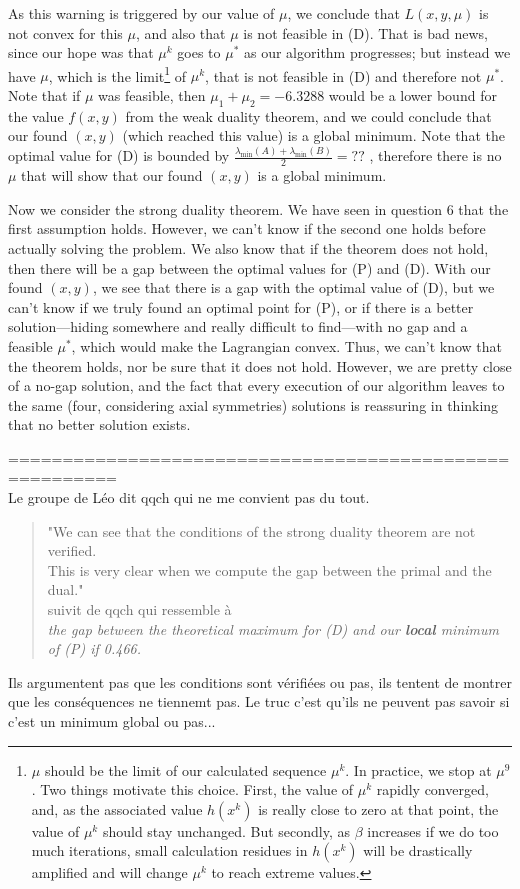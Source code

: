 \documentclass{article}
\begin{document}
As this warning is triggered by our value of $\mu$, we conclude that $L(x, y, \mu)$ is not convex for this $\mu$, and also that $\mu$ is not feasible in (D). That is bad news, since our hope was that $\mu^k$ goes to $\mu^*$ as our algorithm progresses; but instead we have $\mu$, which is the limit\footnote{$\mu$ should be the limit of our calculated sequence $\mu^k$. In practice, we stop at $\mu^9$. Two things motivate this choice. First, the value of $\mu^k$ rapidly converged, and, as the associated value $h(x^k)$ is really close to zero at that point, the value of $\mu^k$ should stay unchanged. But secondly, as $\beta$ increases if we do too much iterations, small calculation residues in $h(x^k)$ will be drastically amplified and will change $\mu^k$ to reach extreme values.}
of $\mu^k$, that is not feasible in (D) and therefore not $\mu^*$. Note that if $\mu$ was feasible, then $\mu_1 + \mu_2 = -6.3288$ would be a lower bound for the value $f(x, y)$ from the weak duality theorem, and we could conclude that our found $(x, y)$ (which reached this value) is a global minimum.
Note that the optimal value for (D) is bounded by $\frac{\lambda_{\min}(A) + \lambda_{\min}(B)}{2} = ??$ , therefore there is no $\mu$ that will show that our found $(x, y)$ is a global minimum. %

Now we consider the strong duality theorem. We have seen in question 6 that the first assumption holds. However, we can't know if the second one holds before actually solving the problem. We also know that if the theorem does not hold, then there will be a gap between the optimal values for (P) and (D). With our found $(x, y)$, we see that there is a gap with the optimal value of (D), but we can't know if we truly found an optimal point for (P), or if there is a better solution---hiding somewhere and really difficult to find---with no gap and a feasible $\mu^*$, which would make the Lagrangian convex. Thus, we can't know that the theorem holds, nor be sure that it does not hold. However, we are pretty close of a no-gap solution, and the fact that every execution of our algorithm leaves to the same (four, considering axial symmetries) solutions is reassuring in thinking that no better solution exists.


\pagebreak
========================================================\\
Le groupe de Léo dit qqch qui ne me convient pas du tout.
\begin{quote}
"We can see that the conditions of the strong duality theorem are not verified.\\
This is very clear when we compute the gap between the primal and the dual."\\
suivit de qqch qui ressemble à\\
\textit{the gap between the theoretical maximum for (D) and our \textbf{local} minimum of (P)  if 0.466.}
\end{quote}
Ils argumentent pas que les conditions sont vérifiées ou pas, ils tentent de montrer que les conséquences ne tiennemt pas. Le truc c'est qu'ils ne peuvent pas savoir si c'est un minimum global ou pas...\\
\end{document}
